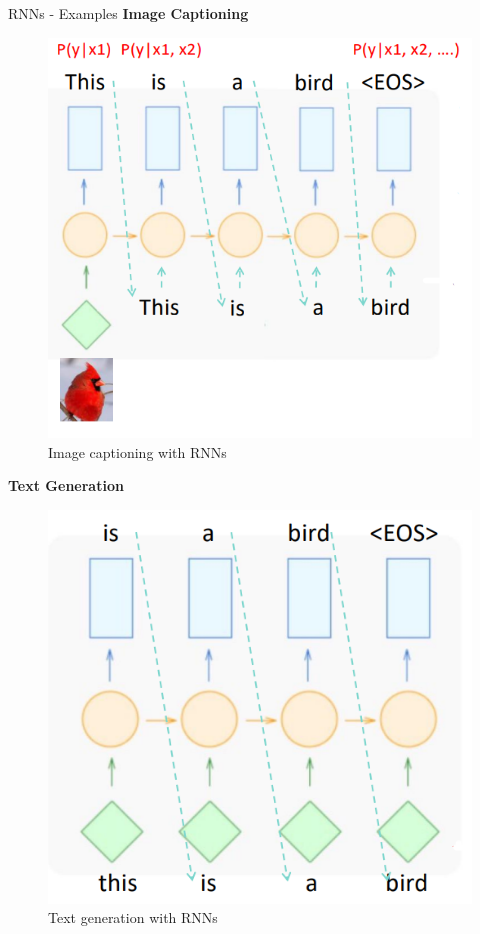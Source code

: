 \begin{frame}[allowframebreaks]{RNNs - Examples}
\textbf{Image Captioning}
\begin{figure}
    \centering
    \includegraphics[height=0.7\textheight, width=\textwidth, keepaspectratio]{images/autoregressive/image_cap.png}
    \caption*{Image captioning with RNNs}
\end{figure}

\framebreak
\textbf{Text Generation}
\begin{figure}
    \centering
    \includegraphics[height=0.7\textheight, width=\textwidth, keepaspectratio]{images/autoregressive/text_gen_ex.png}
    \caption*{Text generation with RNNs}
\end{figure}


\end{frame}
